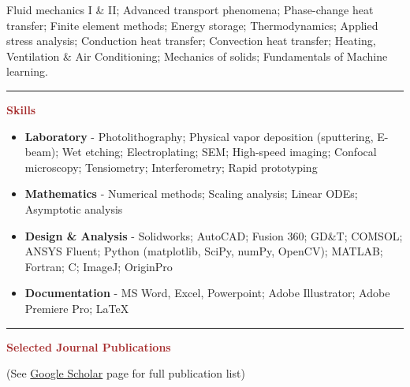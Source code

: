 \documentclass[11pt, letterpaper]{article}
\begin{document}
Fluid mechanics I \& II; Advanced transport phenomena; Phase-change heat transfer; Finite element methods; Energy storage; Thermodynamics; Applied stress analysis; Conduction heat transfer; Convection heat transfer; Heating, Ventilation \& Air Conditioning; Mechanics of solids; Fundamentals of Machine learning.
\vspace{-2pt} \\
\noindent \rule[2pt]{\textwidth}{0.5pt}
\newpage
\noindent \textbf{\large \textcolor{Brown}{Skills}}\vspace{-8pt}
\begin{multicols}{2}
\begin{itemize}[leftmargin=*]
\setlength\itemsep{-2pt}
\item \textbf{Laboratory} - Photolithography; Physical vapor deposition (sputtering, E-beam); Wet etching; Electroplating; SEM; High-speed imaging; Confocal microscopy; Tensiometry; Interferometry; Rapid prototyping
\item \textbf{Mathematics} - Numerical methods; Scaling analysis; Linear ODEs; Asymptotic analysis
\item \textbf{Design \& Analysis} - Solidworks; AutoCAD; Fusion 360; GD\&T; COMSOL; ANSYS Fluent; Python (matplotlib, SciPy, numPy, OpenCV); MATLAB; Fortran; C; ImageJ; OriginPro
\item\textbf{Documentation} - MS Word, Excel, Powerpoint; Adobe Illustrator; Adobe Premiere Pro; \LaTeX
\end{itemize}
\end{multicols}
\vspace{-10pt}
\noindent \rule[2pt]{\textwidth}{0.5pt}
\noindent \textbf{\large \textcolor{Brown}{Selected Journal Publications}}\hfill \raggedright{(See \href{https://scholar.google.com/citations?user=oQHSsp4AAAAJ&hl=en}{Google Scholar} page for full publication list)}\\
\end{document}
